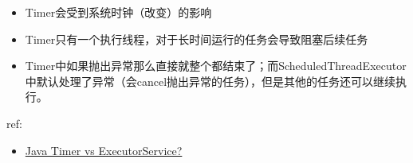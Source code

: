 \documentclass[12pt]{article}
\begin{document}
\begin{itemize}
\tightlist
\item
  Timer会受到系统时钟（改变）的影响
\item
  Timer只有一个执行线程，对于长时间运行的任务会导致阻塞后续任务
\item
  Timer中如果抛出异常那么直接就整个都结束了；而ScheduledThreadExecutor中默认处理了异常（会cancel抛出异常的任务），但是其他的任务还可以继续执行。
\end{itemize}

ref:

\begin{itemize}
\tightlist
\item
  \href{https://stackoverflow.com/questions/409932/java-timer-vs-executorservice}{Java Timer vs ExecutorService?}
\end{itemize}
\end{document}
